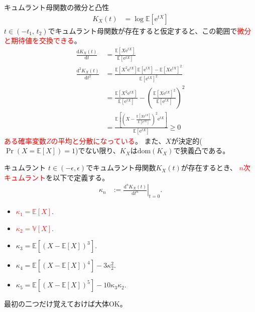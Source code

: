 \documentclass[lualatex,handout]{beamer}
\newcommand{\emm}[1]{\textcolor{red}{#1}}
\newcommand{\expt}[1]{\mathbb{E}\left[#1\right]}
\newcommand{\var}[1]{\mathbb{V}\left[#1\right]}
\theoremstyle{definition}
\begin{document}
\begin{frame}{キュムラント母関数の微分と凸性}
\small
\begin{align*}
K_X(t) &= \log \expt{\mathrm{e}^{tX}}
\end{align*}
$t\in(-t_1,\, t_2)$でキュムラント母関数が存在すると仮定すると、この範囲で\emm{微分と期待値を交換できる}。
%
\begin{align*}
\frac{\mathrm{d} K_X(t)}{\mathrm{d}t} &= \frac{\expt{X\mathrm{e}^{tX}}}{\expt{\mathrm{e}^{tX}}}\\
\frac{\mathrm{d}^2 K_X(t)}{\mathrm{d}t^2} &= \frac{\expt{X^2\mathrm{e}^{tX}}\expt{\mathrm{e}^{tX}}-\expt{X\mathrm{e}^{tX}}^2}{\expt{\mathrm{e}^{tX}}^2}\\
&= \frac{\expt{X^2\mathrm{e}^{tX}}}{\expt{\mathrm{e}^{tX}}}-\left(\frac{\expt{X\mathrm{e}^{tX}}^2}{\expt{\mathrm{e}^{tX}}}\right)^2\\
&= \frac{\expt{\left(X-\frac{\expt{X\mathrm{e}^{tX}}}{\expt{\mathrm{e}^{tX}}}\right)^2\mathrm{e}^{tX}}}{\expt{\mathrm{e}^{tX}}}\ge 0
\end{align*}
\emm{ある確率変数$Z$の平均と分散になっている}。
また、$X$が決定的($\Pr(X=\expt{X})=1$)でない限り、$K_X$は$\mathrm{dom}(K_X)$で狭義凸である。
\end{frame}

\begin{frame}{キュムラント}
$t\in(-\epsilon,\epsilon)$でキュムラント母関数$K_X(t)$が存在するとき、
\emm{$n$次キュムラント}を以下で定義する。
\begin{align*}
\kappa_n &:=\left.\frac{\mathrm{d}^nK_X(t)}{\mathrm{d} t^n}\right|_{t=0}.
\end{align*}

\begin{itemize}
\item \emm{$\kappa_1 = \expt{X}$}.
\item \emm{$\kappa_2 = \var{X}$}.
\item $\kappa_3 = \expt{(X-\expt{X})^3}$.
\item $\kappa_4 = \expt{(X-\expt{X})^4}-3\kappa_2^2$.
\item $\kappa_5 = \expt{(X-\expt{X})^5}-10\kappa_3\kappa_2$.
\end{itemize}

\vspace{2em}
\begin{center}
最初の二つだけ覚えておけば大体OK。
\end{center}
\end{frame}
\end{document}
